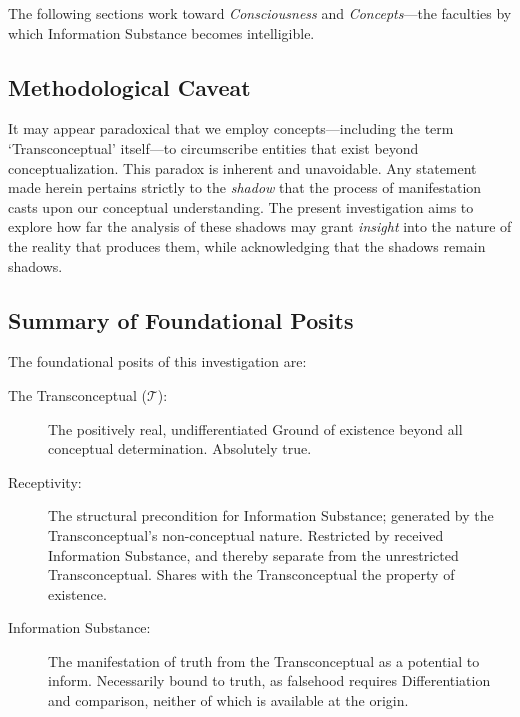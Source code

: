 The following sections work toward \textit{Consciousness} and
\textit{Concepts}---the faculties by which Information Substance becomes
intelligible.

\subsection{Methodological Caveat}

It may appear paradoxical that we employ concepts---including the term
`Transconceptual' itself---to circumscribe entities that exist beyond
conceptualization. This paradox is inherent and unavoidable. Any statement
made herein pertains strictly to the \textit{shadow} that the process of
manifestation casts upon our conceptual understanding. The present
investigation aims to explore how far the analysis of these shadows may grant
\textit{insight} into the nature of the reality that produces them, while
acknowledging that the shadows remain shadows.

\subsection{Summary of Foundational Posits}

\begin{formalism}[Demarcation]
    The foundational posits of this investigation are:
    \begin{description}
        \item[The Transconceptual ($\mathcal{T}$):] The positively real,
        undifferentiated Ground of existence beyond all conceptual
        determination. Absolutely true.

        \item[Receptivity:] The structural precondition for Information
        Substance; generated by the Transconceptual's non-conceptual nature.
        Restricted by received Information Substance, and thereby separate
        from the unrestricted Transconceptual. Shares with the Transconceptual
        the property of existence.

        \item[Information Substance:] The manifestation of truth from the
        Transconceptual as a potential to inform. Necessarily bound to truth,
        as falsehood requires Differentiation and comparison, neither of which
        is available at the origin.
    \end{description}
\end{formalism}


